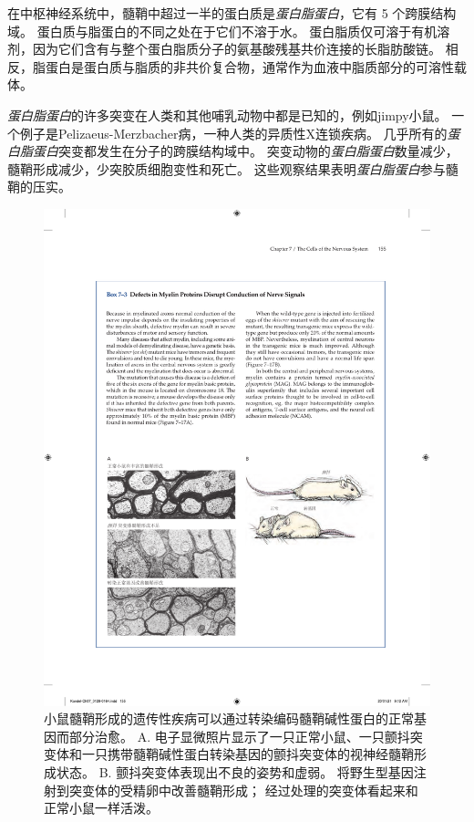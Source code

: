 \begin{proposition}[髓鞘蛋白缺陷破坏神经信号传导]
	\quad \quad 在中枢神经系统中，髓鞘中超过一半的蛋白质是\textit{蛋白脂蛋白}，它有 5 个跨膜结构域。
	蛋白质与脂蛋白的不同之处在于它们不溶于水。
	蛋白脂质仅可溶于有机溶剂，因为它们含有与整个蛋白脂质分子的氨基酸残基共价连接的长脂肪酸链。
	相反，脂蛋白是蛋白质与脂质的非共价复合物，通常作为血液中脂质部分的可溶性载体。
	
	\quad \quad \textit{蛋白脂蛋白}的许多突变在人类和其他哺乳动物中都是已知的，例如jimpy小鼠。
	一个例子是Pelizaeus-Merzbacher病，一种人类的异质性X连锁疾病。
	几乎所有的\textit{蛋白脂蛋白}突变都发生在分子的跨膜结构域中。
	突变动物的\textit{蛋白脂蛋白}数量减少，髓鞘形成减少，少突胶质细胞变性和死亡。
	这些观察结果表明\textit{蛋白脂蛋白}参与髓鞘的压实。
	
\end{proposition}


\begin{figure}[htbp]
	\centering
	\includegraphics[width=1.0\linewidth]{chap07/fig_7_17}
	\caption{小鼠髓鞘形成的遗传性疾病可以通过转染编码髓鞘碱性蛋白的正常基因而部分治愈。
	A. 电子显微照片显示了一只正常小鼠、一只颤抖突变体和一只携带髓鞘碱性蛋白转染基因的颤抖突变体的视神经髓鞘形成状态。
	B. 颤抖突变体表现出不良的姿势和虚弱。
	将野生型基因注射到突变体的受精卵中改善髓鞘形成；
	经过处理的突变体看起来和正常小鼠一样活泼\cite{readhead1987expression}。}
	\label{fig:7_17}
\end{figure}


